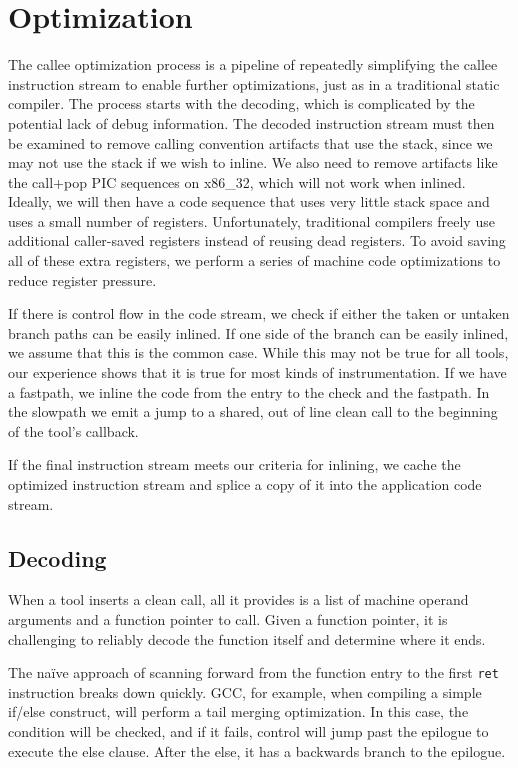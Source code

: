 \chapter{Optimization}

The callee optimization process is a pipeline of repeatedly simplifying the
callee instruction stream to enable further optimizations, just as in a
traditional static compiler.  The process starts with the decoding, which is
complicated by the potential lack of debug information.  The decoded instruction
stream must then be examined to remove calling convention artifacts that use the
stack, since we may not use the stack if we wish to inline.  We also need to
remove artifacts like the call+pop PIC sequences on x86\_32, which will not work
when inlined.  Ideally, we will then have a code sequence that uses very little
stack space and uses a small number of registers.  Unfortunately, traditional
compilers freely use additional caller-saved registers instead of reusing dead
registers.  To avoid saving all of these extra registers, we perform a series of
machine code optimizations to reduce register pressure.

If there is control flow in the code stream, we check if either the taken or
untaken branch paths can be easily inlined.  If one side of the branch can be
easily inlined, we assume that this is the common case.  While this may not be
true for all tools, our experience shows that it is true for most kinds of
instrumentation.  If we have a fastpath, we inline the code from the entry to
the check and the fastpath.  In the slowpath we emit a jump to a shared, out of
line clean call to the beginning of the tool's callback.

If the final instruction stream meets our criteria for inlining, we cache the
optimized instruction stream and splice a copy of it into the application code
stream.

\section{Decoding}
\label{sec:decoding}

When a tool inserts a clean call, all it provides is a list of machine operand
arguments and a function pointer to call.  Given a function pointer, it is
challenging to reliably decode the function itself and determine where it ends.

The na\"ive approach of scanning forward from the function entry to the first
{\tt ret} instruction breaks down quickly.  GCC, for example, when compiling a
simple if/else construct, will perform a tail merging optimization.  In this
case, the condition will be checked, and if it fails, control will jump past the
epilogue to execute the else clause.  After the else, it has a backwards branch
to the epilogue.

